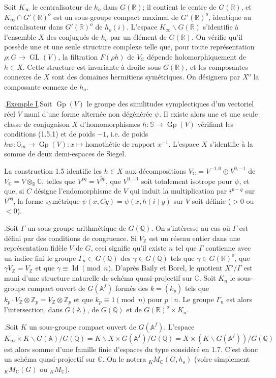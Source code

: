 \documentclass[10pt]{article}
\newcommand{\A}{\mathbb A}
\newcommand{\Af}{\mathbb A^f}
\newcommand{\C}{\mathbb C}
\newcommand{\Gm}{\mathbb G_m}
\newcommand{\Q}{\mathbb Q}
\newcommand{\R}{\mathbb R}
\newcommand{\Z}{\mathbb Z}
\newcommand{\bS}{\mathbb S}
\newcommand{\GL}{\operatorname{GL}}
\newcommand{\Gp}{\operatorname{Gp}}
\newcommand{\id}{\operatorname{Id}}
\newcommand{\MC}{M_{\C}}
\begin{document}
Soit $K_\infty$ le centralisateur de $h_o$ dans $G(\R)$; il contient le centre de $G(\R)$, et $K_\infty\cap G'(\R)^o$ est un sous-groupe compact maximal de $G'(\R)^o$, identique au centralisateur dans $G'(\R)^o$ de $h_o(i)$. L'espace $K_\infty\backslash G(\R)$ s'identifie à l'ensemble $X$ des conjugués de $h_o$ par un élément de $G(\R)$. On vérifie qu'il possède une et une seule structure complexe telle que, pour toute représentation $\rho:G\to\GL(V)$, la filtration $F(\rho h)$ de $V_\C$ dépende holomorphiquement de $h\in X$. Cette structure est invariante à droite sous $G(\R)$, et les composantes connexes de $X$ sont des domaines hermitiens symétriques. On désignera par $X^o$ la composante connexe de $h_o$.

.\quad \uline{Exemple I}.\quad Soit $\Gp(V)$ le groupe des similitudes symplectiques d'un vectoriel réel $V$ muni d'une forme alternée non dégénérée $\psi$. Il existe alors une et une seule classe de conjugaison $X$ d'homomorphismes $h:\bS\to\Gp(V)$ vérifiant les conditions (1.5.1) et de poids $-1$, i.e. de poids $hw:\Gm\to\Gp(V):x\longmapsto\text{homothétie de rapport }x^{-1}$. L'espace $X$ s'identifie à la somme de deux demi-espaces de Siegel.

La construction 1.5 identifie les $h\in X$ aux décompositions $V_\C=V^{-1,0}\oplus V^{0,-1}$ de $V_\C=V\otimes_\R\C$, telles que $V^{pq}=\overline{V^{qp}}$, que $V^{0,-1}$ soit totalement isotrope pour $\psi$, et que, si $C$ désigne l'endomorphisme de $V$ qui induit la multiplication par $i^{p-q}$ sur $V^{pq}$, la forme symétrique $\psi(x,Cy)=\psi(x,h(i)y)$ sur $V$ soit définie ($>0$ ou $<0$).

.\quad Soit $\Gamma$ un sous-groupe arithmétique de $G(\Q)$. On s'intéresse au cas où $\Gamma$ est défini par des conditions de congruence. Si $V_\Z$ est un réseau entier dans une représentation fidèle $V$ de $G$, ceci signifie qu'il existe $n$ tel que $\Gamma$ contienne avec un indice fini le groupe $\Gamma_n\subset G(\Q)$ des $\gamma\in G(\Q)$ tels que $\gamma\in G(\R)^o$,
que $\gamma V_\Z=V_\Z$ et que $\gamma\equiv\id\pmod n$. D'après Baily et Borel, le quotient $X^o/\Gamma$ est muni d'une structure naturelle de schéma quasi-projectif sur $\C$. Soit $K_n$ le sous-groupe compact ouvert de $G(\Af)$ formés des $k=(k_p)$ tels que $k_p\cdot V_\Z\otimes\Z_p=V_\Z\otimes\Z_p$ et que $k_p\equiv1\pmod n$ pour $p\mid n$. Le groupe $\Gamma_n$ est alors l'intersection, dans $G(\A)$, de $G(\Q)$ et de $G(\R)^o\times K_n$.

.\quad Soit $K$ un sous-groupe compact ouvert de $G(\Af)$. L'espace $K_\infty\times K\backslash G(\A)/G(\Q)=K\backslash X\times G(\Af)/G(\Q)=X\times(K\backslash G(\Af))/G(\Q)$ est alors somme d'une famille finie d'espaces du type considéré en 1.7. C'est donc un schéma quasi-projectif sur $\C$. On le notera ${}_K\MC(G,h_o)$ (voire simplement ${}_K\MC(G)$ ou ${}_K\MC$).
\end{document}
